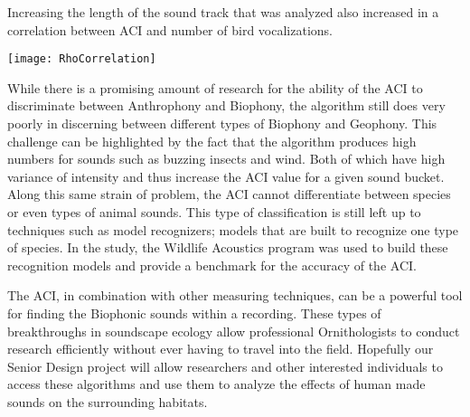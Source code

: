 Increasing the length of the sound track that was analyzed also increased in a correlation between ACI and number of bird vocalizations.

\begin{center}
  \texttt{[image: RhoCorrelation]} \\[12pt]
\end{center}

\par While there is a promising amount of research for the ability of the ACI to discriminate between Anthrophony and Biophony, the algorithm still does very poorly in discerning between different types of Biophony and Geophony. This challenge can be highlighted by the fact that the algorithm produces high numbers for sounds such as buzzing insects and wind. Both of which have high variance of intensity and thus increase the ACI value for a given sound bucket. Along this same strain of problem, the ACI cannot differentiate between species or even types of animal sounds. This type of classification is still left up to techniques such as model recognizers; models that are built to recognize one type of species. In the study, the Wildlife Acoustics program was used to build these recognition models and provide a benchmark for the accuracy of the ACI.
\par The ACI, in combination with other measuring techniques, can be a powerful tool for finding the Biophonic sounds within a recording. These types of breakthroughs in soundscape ecology allow professional Ornithologists to conduct research efficiently without ever having to travel into the field. Hopefully our Senior Design project will allow researchers and other interested individuals to access these algorithms and use them to analyze the effects of human made sounds on the surrounding habitats.\cite{pieretti}
